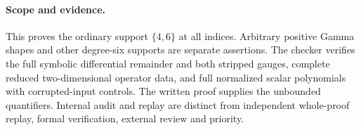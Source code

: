 \documentclass[11pt]{article}
\begin{document}
\paragraph{Scope and evidence.}
This proves the ordinary support $\{4,6\}$ at all indices.
Arbitrary positive Gamma shapes and other degree-six supports
are separate assertions. The checker verifies the full symbolic
differential remainder and both stripped gauges, complete reduced
two-dimensional operator data, and full normalized scalar polynomials
with corrupted-input controls. The written proof supplies the
unbounded quantifiers. Internal audit and replay are distinct from
independent whole-proof replay, formal verification, external review
and priority.
\end{document}
